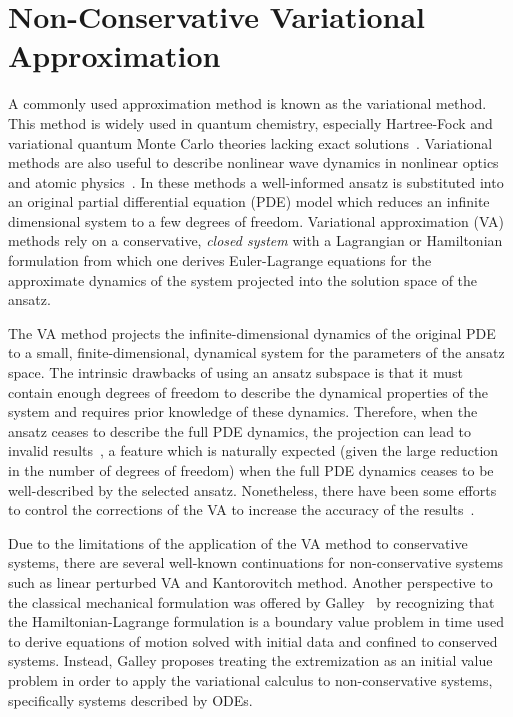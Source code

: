 \chapter{Non-Conservative Variational Approximation}
\label{chap:NCVA}

A commonly used approximation method is known as the variational method.  This method is widely used in quantum chemistry, especially Hartree-Fock and variational quantum Monte Carlo theories lacking exact solutions~\cite{mitroy99f,QMC, Ceperley}.  Variational methods are also useful to describe nonlinear wave dynamics in nonlinear optics and atomic physics~\cite{Boris:02,Boris:06,Dauxois:03,Kivshar:03}.  In these methods a well-informed ansatz is substituted into an original partial differential equation (PDE) model which reduces an infinite dimensional system to a few degrees of freedom.  Variational approximation (VA) methods rely on a conservative, \textit{closed system} with a Lagrangian or Hamiltonian formulation from which one derives Euler-Lagrange equations for the approximate dynamics of the system projected into the solution space of the ansatz.  

The VA method projects the infinite-dimensional dynamics of the original PDE to a small, finite-dimensional, dynamical system for the parameters of the ansatz space.  The intrinsic drawbacks of using an ansatz subspace is that it must contain enough degrees of freedom to describe the dynamical properties of the system and requires prior knowledge of these dynamics.  Therefore, when the ansatz ceases to describe the full PDE dynamics, the projection can lead to invalid results~\cite{Kaup:96}, a feature which is naturally expected (given the large reduction in the
number of degrees of freedom) when the full PDE dynamics ceases to be 
well-described by the selected ansatz.
Nonetheless, there have been some efforts to control the corrections of the
VA to increase the accuracy of the results~\cite{Kaup:07}.

Due to the limitations of the application of the VA method to conservative systems, there are several well-known continuations for non-conservative systems such as linear perturbed VA and Kantorovitch method.  Another perspective to the classical mechanical formulation was offered by Galley~\cite{Galley,Galley:14} by recognizing that the Hamiltonian-Lagrange formulation is a boundary value problem in time used to derive equations of motion solved with initial data and confined to conserved systems.  Instead, Galley proposes treating the extremization as an initial value problem in order to apply the variational calculus to non-conservative systems, specifically systems described by ODEs.    

